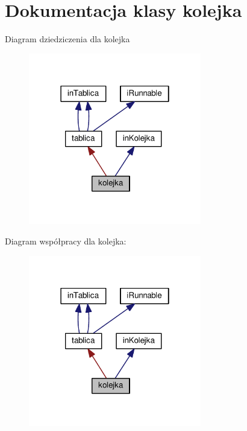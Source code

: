 \section{Dokumentacja klasy kolejka}
\label{classkolejka}


Diagram dziedziczenia dla kolejka
\nopagebreak
\begin{figure}[H]
\begin{center}
\leavevmode
\includegraphics[width=214pt]{classkolejka__inherit__graph}
\end{center}
\end{figure}


Diagram współpracy dla kolejka\+:
\nopagebreak
\begin{figure}[H]
\begin{center}
\leavevmode
\includegraphics[width=214pt]{classkolejka__coll__graph}
\end{center}
\end{figure}
